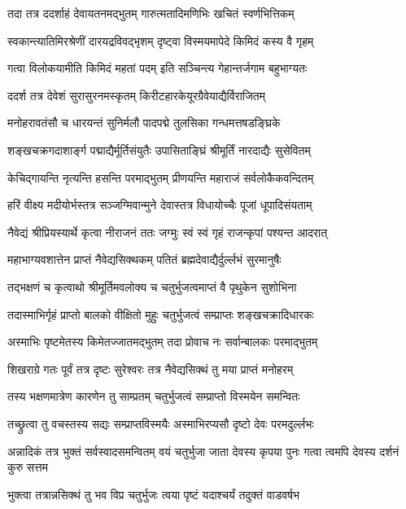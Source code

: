 \twolineshloka
{तदा तत्र ददर्शाहं देवायतनमद्भुतम्}
{गारुत्मतादिमणिभिः खचितं स्वर्णभित्तिकम्}%

\twolineshloka
{स्वकान्त्यातिमिरश्रेणीं दारयद्रविवद्भृशम्}
{दृष्ट्वा विस्मयमापेदे किमिदं कस्य वै गृहम्}%

\twolineshloka
{गत्वा विलोकयामीति किमिदं महतां पदम्}
{इति सञ्चिन्त्य गेहान्तर्जगाम बहुभाग्यतः}%

\twolineshloka
{ददर्श तत्र देवेशं सुरासुरनमस्कृतम्}
{किरीटहारकेयूरग्रैवेयाद्यैर्विराजितम्}%

\twolineshloka
{मनोहरावतंसौ च धारयन्तं सुनिर्मलौ}
{पादपद्मे तुलसिका गन्धमत्तषडङ्घ्रिके}%

\twolineshloka
{शङ्खचक्रगदाशार्ङ्ग पद्माद्यैर्मूर्तिसंयुतैः}
{उपासिताङ्घ्रिं श्रीमूर्तिं नारदाद्यैः सुसेवितम्}%

\twolineshloka
{केचिद्गायन्ति नृत्यन्ति हसन्ति परमाद्भुतम्}
{प्रीणयन्ति महाराजं सर्वलोकैकवन्दितम्}%

\twolineshloka
{हरिं वीक्ष्य मदीयोर्भस्तत्र सञ्जग्मिवान्मुने}
{देवास्तत्र विधायोच्चैः पूजां धूपादिसंयताम्}%

\twolineshloka
{नैवेद्यं श्रीप्रियस्यार्थे कृत्वा नीराजनं ततः}
{जग्मुः स्वं स्वं गृहं राजन्कृपां पश्यन्त आदरात्}%

\twolineshloka
{महाभाग्यवशात्तेन प्राप्तं नैवेद्यसिक्थकम्}
{पतितं ब्रह्मदेवाद्यैर्दुर्ल्लभं सुरमानुषैः}%

\twolineshloka
{तद्भक्षणं च कृत्वाथो श्रीमूर्तिमवलोक्य च}
{चतुर्भुजत्वमाप्तं वै पृथुकेन सुशोभिना}%

\twolineshloka
{तदास्माभिर्गृहं प्राप्तो बालको वीक्षितो मुहुः}
{चतुर्भुजत्वं सम्प्राप्तः शङ्खचक्रादिधारकः}%

\twolineshloka
{अस्माभिः पृष्टमेतस्य किमेतज्जातमद्भुतम्}
{तदा प्रोवाच नः सर्वान्बालकः परमाद्भुतम्}%

\twolineshloka
{शिखराग्रे गतः पूर्वं तत्र दृष्टः सुरेश्वरः}
{तत्र नैवेद्यसिक्थं तु मया प्राप्तं मनोहरम्}%

\twolineshloka
{तस्य भक्षणमात्रेण कारणेन तु साम्प्रतम्}
{चतुर्भुजत्वं सम्प्राप्तो विस्मयेन समन्वितः}%

\twolineshloka
{तच्छ्रुत्वा तु वचस्तस्य सद्यः सम्प्राप्तविस्मयैः}
{अस्माभिरप्यसौ दृष्टो देवः परमदुर्ल्लभः}%



{अन्नादिकं तत्र भुक्तं सर्वस्वादसमन्वितम्}
{वयं चतुर्भुजा जाता देवस्य कृपया पुनः}
{गत्वा त्वमपि देवस्य दर्शनं कुरु सत्तम}%

\twolineshloka
{भुक्त्वा तत्रान्नसिक्थं तु भव विप्र चतुर्भुजः}
{त्वया पृष्टं यदाश्चर्यं तदुक्तं वाडवर्षभ}%

